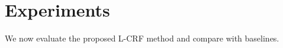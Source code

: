 \documentclass[11pt,a4paper]{article}
\theoremstyle{definition}
\begin{document}

    

      
\section{Experiments} 
    We now evaluate the proposed L-CRF method and compare with baselines.  
    
\end{document}
